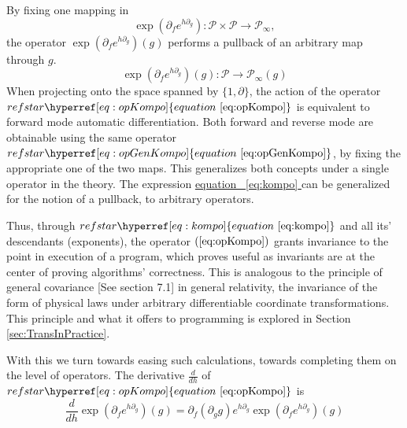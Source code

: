 \documentclass{article}
\makeatletter
\newcommand{\dP}{\mathcal{P}}
\newcommand{\D}{\partial}
\let\originaleqref\eqref %
\renewcommand{\eqref}[1]{%
  \begingroup%
  \let\ref\@refstar%
  \hyperref[#1]{%
    equation%
    ~\originaleqref{#1}%
  }%
  \endgroup
}
\makeatother
\begin{document}
 By fixing one mapping in  
 \begin{equation}\label{eq:opGenKompo}
\exp(\D_fe^{h\D_g}): \dP\times\dP\to\dP_\infty,
 \end{equation}
 the operator $\exp(\D_fe^{h\D_g})(g)$ performs a pullback of an arbitrary map through $g$. 
  \begin{equation}\label{eq:opKompo}
  \exp(\D_fe^{h\D_g})(g): \dP\to\dP_\infty(g)
  \end{equation}
 When projecting onto the space spanned by $\{1,\D\}$, the action of the operator $\eqref{eq:opKompo}$ is equivalent to forward mode automatic differentiation. Both forward and reverse mode are obtainable using the same operator $\eqref{eq:opGenKompo}$, by fixing the appropriate one of the two maps. This generalizes both concepts under a single operator in the theory. The expression \eqref{eq:kompo} can be generalized for the notion of a pullback, to arbitrary operators.
 
 Thus, through $\eqref{eq:kompo}$ and all its' descendants (exponents), the operator $(\ref{eq:opKompo})$ grants invariance to the point in execution of a program, which proves useful as invariants are at the center of proving algorithms' correctness. This is analogous to the principle of general covariance \cite{GeneralCovariance}[See section 7.1] in general relativity, the invariance of the form of physical laws under arbitrary differentiable coordinate transformations. This principle and what it offers to programming is explored in Section \ref{sec:TransInPractice}.
 
 With this we turn towards easing such calculations, towards completing them on the level of operators. The derivative $\frac{d}{dh}$ of $\eqref{eq:opKompo}$ is
 \begin{equation}\label{eq:dexp}
 \frac{d}{dh}\exp(\D_fe^{h\D_g})(g)=\D_f(\D_gg)e^{h\D_g}\exp(\D_fe^{h\D_g})(g)
 \end{equation}
 
\end{document}
